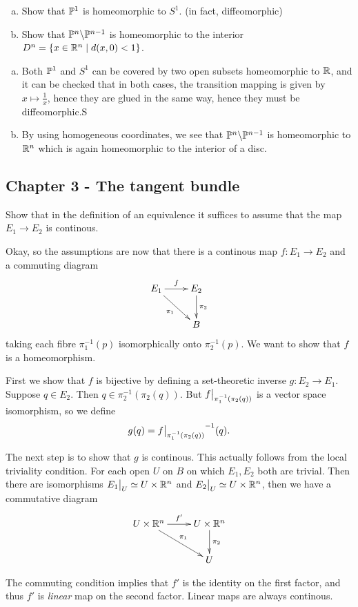 \documentclass[11pt, english]{article}
\begin{document}
\begin{exc}[Exercise 15]
  \begin{enumerate}[a)]
  \item   Show that $\mathbb{P}^1$ is homeomorphic to $S^1$. (in fact, diffeomorphic)
\item Show that $\mathbb{P}^n \backslash \mathbb{P}^{n-1}$ is homeomorphic to the interior $D^n=\{ x \in \mathbb{R}^n \mid d(x,0) < 1 \}$.
  \end{enumerate}
\end{exc}
\begin{sol}
  \begin{enumerate}[a)]
  \item Both $\mathbb{P}^1$ and $S^1$ can be covered by two open subsets homeomorphic to $\mathbb{R}$, and it can be checked that in both cases, the transition mapping is given by $x \mapsto \frac 1x$, hence they are glued in the same way, hence they must be diffeomorphic.S
\item By using homogeneous coordinates, we see that $\mathbb{P}^n \backslash \mathbb{P}^{n-1}$ is homeomorphic to $\mathbb{R}^n$ which is again homeomorphic to the interior of a disc.
  \end{enumerate}
\end{sol}

\subsection{Chapter 3 - The tangent bundle}
\begin{exc}
Show that in the definition of an equivalence it suffices to assume that the map $E_1 \to E_2$ is continous. 
\end{exc}
\begin{sol}
Okay, so the assumptions are now that there is a continous map $f:E_1 \to E_2$  and a commuting diagram
$$
\xymatrix{
E_1 \ar[dr]_{\pi_1} \ar[r]^f & E_2 \ar[d]^{\pi_2} \\
& B
}
$$
taking each fibre $\pi_1^{-1}(p)$ isomorphically onto $\pi_2^{-1}(p)$. We want to show that $f$ is a homeomorphism.

First we show that $f$ is bijective by defining a set-theoretic inverse $g:E_2 \to E_1$. Suppose $q \in E_2$. Then $q \in \pi_2^{-1}(\pi_2(q))$. But $\restr{f}{\pi_1^{-1}(\pi_2(q))}$ is a vector space isomorphism, so we define
$$
g(q) = \restr{f}{\pi_1^{-1}(\pi_2(q))}^{-1}(q).
$$

The next step is to show that $g$ is continous. This actually follows from the local triviality condition. For each open $U$ on $B$ on which $E_1,E_2$ both are trivial. Then there are isomorphisms $\restr{E_1}{U} \simeq U \times \R^n$ and $\restr{E_2}{U} \simeq U \times \R^n$, then we have a commutative diagram
$$
\xymatrix{
U \times \R^n  \ar[dr]^{\pi_1} \ar[r]^{f'} & U \times \R^n  \ar[d]^{\pi_2}\\
& U 
}
$$

The commuting condition implies that $f'$ is the identity on the first factor, and thus $f'$ is \emph{linear} map on the second factor. Linear maps are always continous.
\end{sol}
\end{document}
